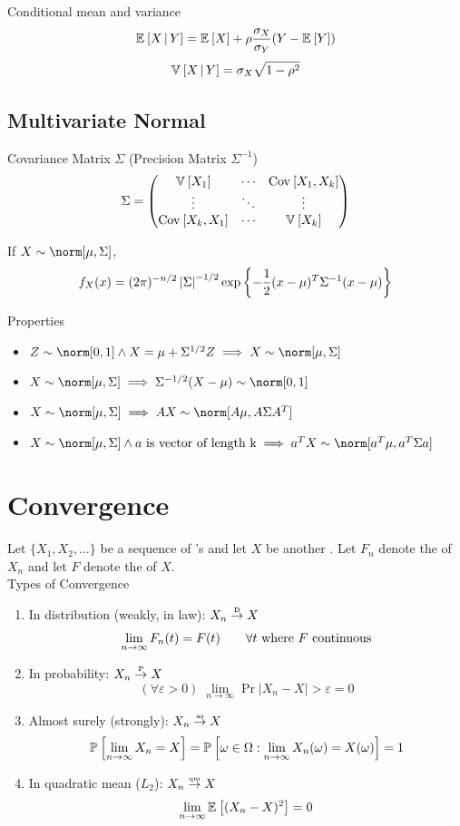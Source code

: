 \documentclass[landscape]{article}
\newenvironment{titemize}[1]{
  \begin{minipage}[h]{\columnwidth}
    #1
    \begin{itemize}
}{
    \end{itemize}
  \end{minipage}
}
\begin{document}
\begin{multicols*}{2}
Conditional mean and variance
$$\mathbb{E}_{}\left[X\,|\, Y\right] = \mathbb{E}_{}\left[X\right] + \rho\frac{\sigma_X}{\sigma_Y}(Y-\mathbb{E}_{}\left[Y\right])$$
$$\mathbb{V}_{}\left[X\,|\, Y\right] = \sigma_X \sqrt{1-\rho^2}$$

\subsection{Multivariate Normal}

Covariance Matrix $\Sigma$ \quad (Precision Matrix $\Sigma^{-1}$)
$$\Sigma = 
  \begin{pmatrix}
  \mathbb{V}_{}\left[X_1\right] & \cdots & \mathrm{Cov}_{}\left[X_1,X_k\right] \\
  \vdots & \ddots & \vdots \\
  \mathrm{Cov}_{}\left[X_k,X_1\right] & \cdots & \mathbb{V}_{}\left[X_k\right]
  \end{pmatrix}$$

If $X \dist \norm[\mu,\Sigma]$,
$$f_X(x) = (2\pi)^{-n/2} \left|\Sigma\right|^{-1/2} 
\exp\left\{-\frac{1}{2}(x-\mu)^T\Sigma^{-1}(x-\mu)\right\} $$

\begin{titemize}{Properties}
  \item $Z \dist \norm[0,1] \wedge X = \mu+\Sigma^{1/2}Z 
    \imp X \dist \norm[\mu,\Sigma]$
  \item $X \dist \norm[\mu,\Sigma] \imp \Sigma^{-1/2}(X-\mu) \dist \norm[0,1]$
  \item $X \dist \norm[\mu,\Sigma] \imp AX \dist \norm[A\mu, A\Sigma A^T]$
  \item $X \dist \norm[\mu,\Sigma] \wedge a \text{ is vector of length k}
    \imp a^TX \dist \norm[a^T\mu, a^T\Sigma a]$
\end{titemize}

\section{Convergence}

Let $\{X_1,X_2,\ldots\}$ be a sequence of \rv's and let $X$ be another \rv.
Let $F_n$ denote the \cdf of $X_n$ and let $F$ denote the \cdf of $X$.\\

Types of Convergence
\begin{enumerate}
  \item In distribution (weakly, in law): $X_n \stackrel{\text{\tiny{D}}}{\rightarrow} X$ 
    $$\lim_{n\to \infty} F_n(t) = F(t) \qquad \forall t \text{ where } F \text{ continuous}$$
  \item In probability: $X_n \stackrel{\text{\tiny{P}}}{\rightarrow} X$ 
    $$(\forall \varepsilon > 0) \; 
    \lim_{n\to\infty} \Pr{|X_n -X| > \varepsilon} = 0$$
  \item Almost surely (strongly): $X_n \stackrel{\text{\tiny{as}}}{\rightarrow} X$
    $$\mathbb{P}_{}\left[\lim_{n\to \infty} X_n=X\right] = \mathbb{P}_{}\left[\omega\in\Omega: \lim_{n\to \infty} X_n(\omega)=X(\omega)\right]=1$$
  \item In quadratic mean ($L_2$): $X_n \stackrel{\text{\tiny{qm}}}{\rightarrow} X$
    $$\lim_{n\to\infty} \mathbb{E}_{}\left[(X_n - X)^2\right] = 0$$
\end{enumerate}


\end{multicols*}
\end{document}

